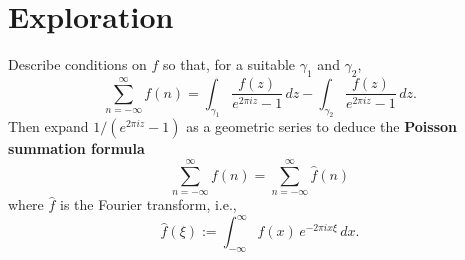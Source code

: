 \documentclass{homework}
\begin{document}
                                                  \section{Exploration}

                                                  \begin{problem}\label{poisson-summation}Describe conditions on $f$ so
                                                    that, for a suitable $\gamma_1$ and $\gamma_2$,
                                                      \[
                                                          \sum_{n=-\infty}^\infty f(n) = \int_{\gamma_1} \frac{f(z)}{e^{2\pi i z} - 1} \, dz - \int_{\gamma_2} \frac{f(z)}{e^{2\pi i z} - 1} \, dz.
                                                            \]
                                                              Then expand $1/(e^{2\pi i z} - 1)$ as a geometric series to deduce the \textbf{Poisson summation formula}
                                                                \[
                                                                    \sum_{n=-\infty}^\infty f(n) = \sum_{n=-\infty}^\infty \hat{f}(n) 
                                                                      \]
                                                                        where $\hat{f}$ is the Fourier transform, i.e.,
                                                                          \[
                                                                              {\hat {f}}(\xi ) := \int _{-\infty }^{\infty} f(x) \, e^{-2\pi ix \xi} \,dx.
                                                                                \]
                                                                                \end{problem}
\end{document}
